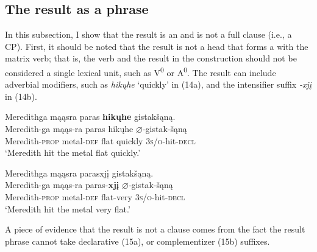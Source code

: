 \documentclass[output=paper]{LSP/langsci}
\begin{document}
\subsection{The result  as a phrase}\label{sec:rosen:3.1}

In this subsection, I show that the result is an  and is not a full clause (i.e., a CP). First, it should be noted that the result is not a head that forms a  with the matrix verb; that is, the verb and the result in the construction should not be considered a single lexical unit, such as V\textsuperscript{0} or A\textsuperscript{0}. The result can include adverbial modifiers, such as \textit{hikųhe} `quickly' in (14a), and the intensifier suffix \textit{-xjį} in (14b).

\begin{exe}
\ex\label{ex:rosen:14}
\begin{xlist}

\ex \glll Meredithga mąąsra paras \textbf{hikųhe} gistakšąną. \\
 Meredith-ga mąąs-ra paras hikųhe {$\varnothing$}-gistak-šąną\\
Meredith-\textsc{prop} metal-\textsc{def} flat quickly \textsc{3s/o}-hit-\textsc{decl}\\ 
\glt `Meredith hit the metal flat quickly.'


\ex \glll Meredithga mąąsra parasxjį gistakšąną.\\
 Meredith-ga mąąs-ra paras-\textbf{xjį} {$\varnothing$}-gistak-šąną\\
Meredith-\textsc{prop} metal-\textsc{def} flat-very  \textsc{3s/o}-hit-\textsc{decl}\\
\glt `Meredith hit the metal very flat.'

\end{xlist}
\end{exe}

A piece of evidence that the result  is not a clause comes from the fact the result phrase cannot take declarative (15a), or complementizer (15b) suffixes.

\begin{exe}
\ex\label{ex:rosen:15}
\begin{xlist}



\end{xlist}
\end{exe}
\end{document}
